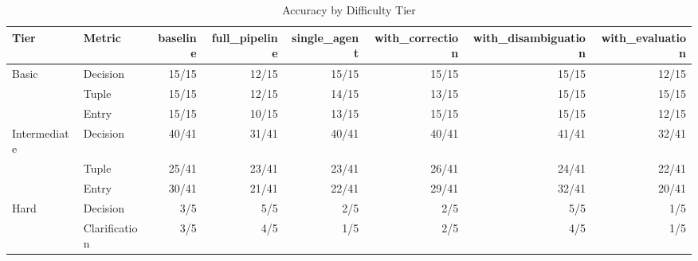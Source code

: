 \begin{table}[htbp]
\centering
\caption{Accuracy by Difficulty Tier}
\label{tab:tier-breakdown}
\begin{tabular}{ll rrrrrr}
\toprule
Tier & Metric & baseline & full\_pipeline & single\_agent & with\_correction & with\_disambiguation & with\_evaluation \\
\midrule
  Basic & Decision & 15/15 & 12/15 & 15/15 & 15/15 & 15/15 & 12/15 \\
   & Tuple & 15/15 & 12/15 & 14/15 & 13/15 & 15/15 & 15/15 \\
   & Entry & 15/15 & 10/15 & 13/15 & 15/15 & 15/15 & 12/15 \\
  \midrule
  Intermediate & Decision & 40/41 & 31/41 & 40/41 & 40/41 & 41/41 & 32/41 \\
   & Tuple & 25/41 & 23/41 & 23/41 & 26/41 & 24/41 & 22/41 \\
   & Entry & 30/41 & 21/41 & 22/41 & 29/41 & 32/41 & 20/41 \\
  \midrule
  Hard & Decision & 3/5 & 5/5 & 2/5 & 2/5 & 5/5 & 1/5 \\
   & Clarification & 3/5 & 4/5 & 1/5 & 2/5 & 4/5 & 1/5 \\
\bottomrule
\end{tabular}
\end{table}

